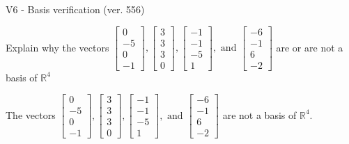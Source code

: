\begin{exercise}
  \begin{exerciseTitle}V6 - Basis verification (ver. 556)\end{exerciseTitle}
  \begin{exerciseStatement}
    Explain why the vectors \(\left[\begin{array}{r}
0 \\
-5 \\
0 \\
-1
\end{array}\right] , \left[\begin{array}{r}
3 \\
3 \\
3 \\
0
\end{array}\right] , \left[\begin{array}{r}
-1 \\
-1 \\
-5 \\
1
\end{array}\right] , \text{ and } \left[\begin{array}{r}
-6 \\
-1 \\
6 \\
-2
\end{array}\right]\) are or are not a basis of \(\mathbb{R}^4\)	


  \end{exerciseStatement}
  \begin{exerciseAnswer}
   The vectors \(\left[\begin{array}{r}
0 \\
-5 \\
0 \\
-1
\end{array}\right] , \left[\begin{array}{r}
3 \\
3 \\
3 \\
0
\end{array}\right] , \left[\begin{array}{r}
-1 \\
-1 \\
-5 \\
1
\end{array}\right] , \text{ and } \left[\begin{array}{r}
-6 \\
-1 \\
6 \\
-2
\end{array}\right]\) 
  	 are not  a basis of \(\mathbb{R}^4\).
  


  \end{exerciseAnswer}
\end{exercise}